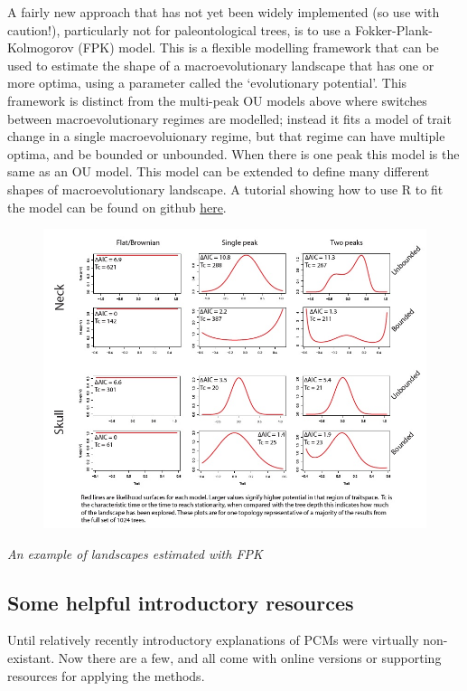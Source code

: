 \documentclass[]{article}
\begin{document}
A fairly new approach that has not yet been widely implemented (so use
with caution!), particularly not for paleontological trees, is to use a
Fokker-Plank-Kolmogorov (FPK) model. This is a flexible modelling
framework that can be used to estimate the shape of a macroevolutionary
landscape that has one or more optima, using a parameter called the
`evolutionary potential'. This framework is distinct from the multi-peak
OU models above where switches between macroevolutionary regimes are
modelled; instead it fits a model of trait change in a single
macroevoluionary regime, but that regime can have multiple optima, and
be bounded or unbounded. When there is one peak this model is the same
as an OU model. This model can be extended to define many different
shapes of macroevolutionary landscape. A tutorial showing how to use R
to fit the model can be found on github
\href{https://github.com/fcboucher/BBMV/blob/master/Tutorial-BBMV.md}{here}.

\begin{figure}
\centering
\includegraphics{FPK.jpg}
\caption{}
\end{figure}

\emph{An example of landscapes estimated with FPK}

\subsection{Some helpful introductory
resources}\label{some-helpful-introductory-resources}

Until relatively recently introductory explanations of PCMs were
virtually non-existant. Now there are a few, and all come with online
versions or supporting resources for applying the methods.
\end{document}
